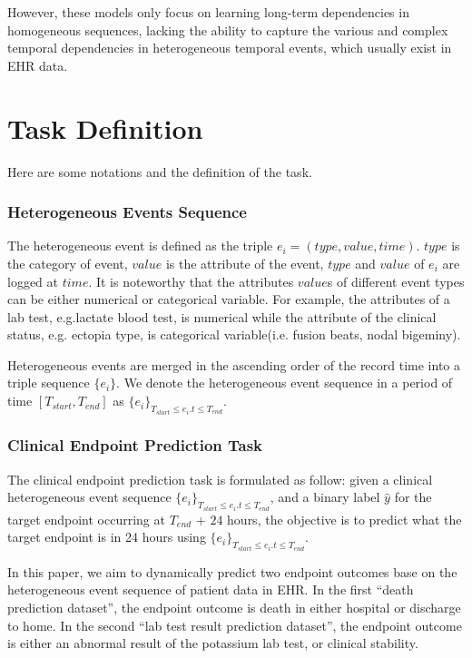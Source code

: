 \documentclass[letterpaper]{article} %
\begin{document}
However, these models only focus on learning long-term dependencies in homogeneous sequences, lacking the ability to capture the various and complex temporal dependencies in heterogeneous temporal events, which usually exist in EHR data.



\section{Task Definition}
Here are some notations and the definition of the task.

\subsubsection{Heterogeneous Events Sequence}
The heterogeneous event is defined as the triple $e_i = (type,value,time)$.  $type$ is the category of event, $value$ is the attribute of the event, $type$ and $value$ of $e_i$ are logged at $time$.  %
It is noteworthy that the attributes $value$s of different event types  can be either numerical or categorical variable. For example, the attributes of a lab test, e.g.lactate blood  test, is numerical while the attribute of the clinical status, e.g. ectopia type, is categorical variable(i.e. fusion beats, nodal bigeminy).

Heterogeneous events are merged in the ascending order of the record time into a triple sequence $\{e_i\}$.
We denote the heterogeneous event sequence in a period of time $[T_{start},T_{end}]$ as $\{e_i\}_{T_{start}\leq e_i.t\leq T_{end}}$.

\subsubsection{Clinical Endpoint Prediction Task}

The clinical endpoint prediction task is formulated as follow: given a clinical heterogeneous event sequence $\{e_i\}_{T_{start}\leq e_i.t\leq T_{end}}$, and a binary label $\hat{y}$ for the target endpoint occurring at $ T_{end}$ + $24$ hours, the objective is to predict what the target endpoint is in 24 hours using $\{e_i\}_{T_{start}\leq e_i.t\leq T_{end}}$.

In this paper, we aim to dynamically predict two endpoint outcomes base on the heterogeneous event sequence of patient data in EHR. In the first ``death prediction dataset'', the endpoint outcome is death in either hospital or discharge to home. In the second ``lab test result prediction dataset'', the endpoint outcome is either an abnormal result of the potassium lab test, or clinical stability.
\end{document}
